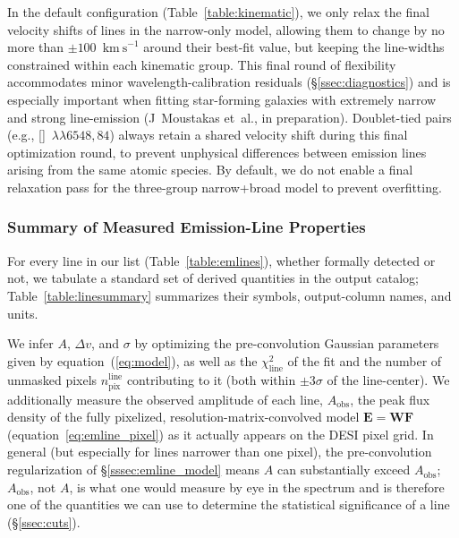 \documentclass[modern,linenumbers]{aastex701}
\newcommand{\kms}{\ensuremath{\mathrm{km~s}^{-1}}}
\newcommand{\niidoublet}{[\ion{N}{2}]~$\lambda\lambda6548,84$}
\begin{document}
In the default configuration (Table~\ref{table:kinematic}), we only
relax the final velocity shifts of lines in the narrow-only model,
allowing them to change by no more than $\pm100$~\kms{} around their
best-fit value, but keeping the line-widths constrained within each
kinematic group. This final round of flexibility accommodates minor
wavelength-calibration residuals (\S\ref{ssec:diagnostics}) and is
especially important when fitting star-forming galaxies with extremely
narrow and strong line-emission (J~Moustakas et~al., in
preparation). Doublet-tied pairs (e.g., \niidoublet) always retain a
shared velocity shift during this final optimization round, to prevent
unphysical differences between emission lines arising from the same
atomic species. By default, we do not enable a final relaxation pass
for the three-group narrow+broad model to prevent overfitting.


\subsubsection{Summary of Measured Emission-Line Properties}
\label{sssec:lines}

For every line in our list (Table~\ref{table:emlines}), whether
formally detected or not, we tabulate a standard set of derived
quantities in the output catalog; Table~\ref{table:linesummary}
summarizes their symbols, output-column names, and units.

We infer $A$, $\Delta v$, and $\sigma$ by optimizing the
pre-convolution Gaussian parameters given by
equation~(\ref{eq:model}), as well as the $\chi^2_\mathrm{line}$ of
the fit and the number of unmasked pixels
$n_\mathrm{pix}^\mathrm{line}$ contributing to it (both within
$\pm3\sigma$ of the line-center). We additionally measure the observed
amplitude of each line, $A_\mathrm{obs}$, the peak flux density of the
fully pixelized, resolution-matrix-convolved model
$\mathbf{E}=\mathbf{W}\mathbf{F}$ (equation~\ref{eq:emline_pixel}) as
it actually appears on the DESI pixel grid. In general (but especially
for lines narrower than one pixel), the pre-convolution regularization
of \S\ref{sssec:emline_model} means $A$ can substantially exceed
$A_\mathrm{obs}$; $A_\mathrm{obs}$, not $A$, is what one would measure
by eye in the spectrum and is therefore one of the quantities we can
use to determine the statistical significance of a line
(\S\ref{ssec:cuts}).
\end{document}
